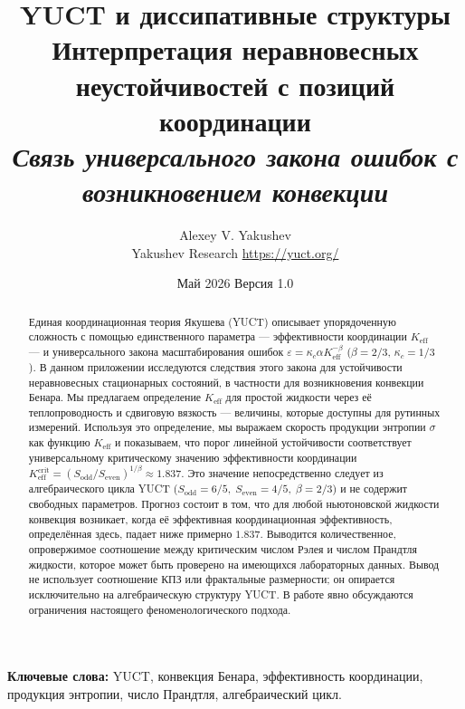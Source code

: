\documentclass[12pt,a4paper]{article}
\begin{document}
	
	\title{\huge\textbf{YUCT и диссипативные структуры}\\[0.2cm]
		\Large Интерпретация неравновесных неустойчивостей с позиций координации\\[0.3cm]
		\large \textit{Связь универсального закона ошибок с возникновением конвекции}}
	\author{Alexey V. Yakushev\\[0.2cm] \small Yakushev Research \quad \url{https://yuct.org/}}
	\date{\small Май 2026 \quad Версия 1.0}
	\maketitle
	
	\begin{abstract}
		\noindent 
		Единая координационная теория Якушева (YUCT) описывает упорядоченную сложность с помощью единственного параметра — эффективности координации \(K_{\mathrm{eff}}\) — и универсального закона масштабирования ошибок \(\varepsilon = \kappa_c\alpha K_{\mathrm{eff}}^{-\beta}\) (\(\beta = 2/3\), \(\kappa_c = 1/3\)). В данном приложении исследуются следствия этого закона для устойчивости неравновесных стационарных состояний, в частности для возникновения конвекции Бенара. Мы предлагаем определение \(K_{\mathrm{eff}}\) для простой жидкости через её теплопроводность и сдвиговую вязкость — величины, которые доступны для рутинных измерений. Используя это определение, мы выражаем скорость продукции энтропии \(\sigma\) как функцию \(K_{\mathrm{eff}}\) и показываем, что порог линейной устойчивости соответствует универсальному критическому значению эффективности координации \(K_{\mathrm{eff}}^{\mathrm{crit}} = (S_{\mathrm{odd}}/S_{\mathrm{even}})^{1/\beta} \approx 1.837\). Это значение непосредственно следует из алгебраического цикла YUCT (\(S_{\mathrm{odd}} = 6/5,\; S_{\mathrm{even}} = 4/5,\; \beta = 2/3\)) и не содержит свободных параметров. Прогноз состоит в том, что для любой ньютоновской жидкости конвекция возникает, когда её эффективная координационная эффективность, определённая здесь, падает ниже примерно \(1.837\). Выводится количественное, опровержимое соотношение между критическим числом Рэлея и числом Прандтля жидкости, которое может быть проверено на имеющихся лабораторных данных. Вывод не использует соотношение КПЗ или фрактальные размерности; он опирается исключительно на алгебраическую структуру YUCT. В работе явно обсуждаются ограничения настоящего феноменологического подхода.
	\end{abstract}
	\vspace{0.5cm}
	\noindent\textbf{Ключевые слова:} YUCT, конвекция Бенара, эффективность координации, продукция энтропии, число Прандтля, алгебраический цикл.
	
\end{document}
